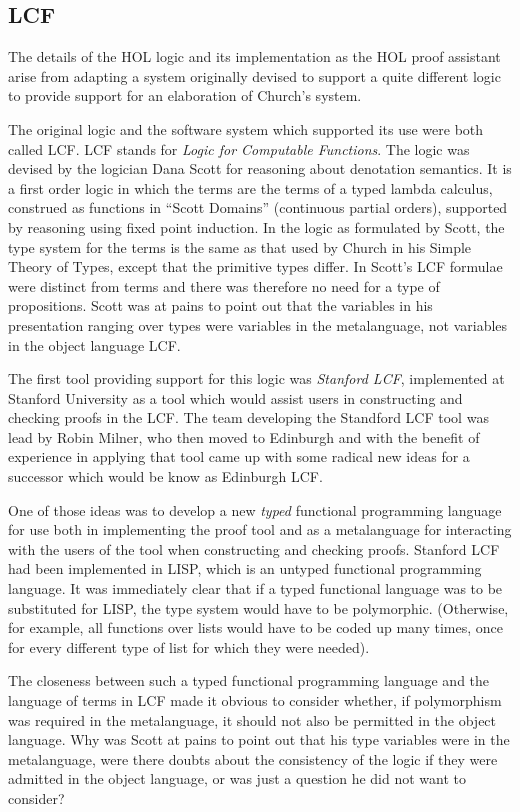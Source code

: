 \documentclass[10pt,titlepage]{book}
\begin{document}
\subsection{LCF}

The details of the HOL logic and its implementation as the HOL proof assistant arise from adapting a system originally devised to support a quite different logic to provide support for an elaboration of Church's system.

The original logic and the software system which supported its use were both called LCF.
LCF stands for {\it Logic for Computable Functions}.
The logic was devised by the logician Dana Scott for reasoning about denotation semantics.
It is a first order logic in which the terms are the terms of a typed lambda calculus, construed as functions in ``Scott Domains'' (continuous partial orders), supported by reasoning using fixed point induction.
In the logic as formulated by Scott, the type system for the terms is the same as that used by Church in his Simple Theory of Types, except that the primitive types differ.
In Scott's LCF formulae were distinct from terms and there was therefore no need for a type of propositions.
Scott was at pains to point out that the variables in his presentation ranging over types were variables in the metalanguage, not variables in the object language LCF.

The first tool providing support for this logic was {\it Stanford LCF}, implemented at Stanford University as a tool which would assist users in constructing and checking proofs in the LCF.
The team developing the Standford LCF tool was lead by Robin Milner, who then moved to Edinburgh and with the benefit of experience in applying that tool came up with some radical new ideas for a successor which would be know as Edinburgh LCF.

One of those ideas was to develop a new {\it typed} functional programming language for use both in implementing the proof tool and as a metalanguage for interacting with the users of the tool when constructing and checking proofs.
Stanford LCF had been implemented in LISP, which is an untyped functional programming language.
It was immediately clear that if a typed functional language was to be substituted for LISP, the type system would have to be polymorphic.
(Otherwise, for example, all functions over lists would have to be coded up many times, once for every different type of list for which they were needed).

The closeness between such a typed functional programming language and the language of terms in LCF made it obvious to consider whether, if polymorphism was required in the metalanguage, it should not also be permitted in the object language.
Why was Scott at pains to point out that his type variables were in the metalanguage, were there doubts about the consistency of the logic if they were admitted in the object language, or was just a question he did not want to consider?
\end{document}
